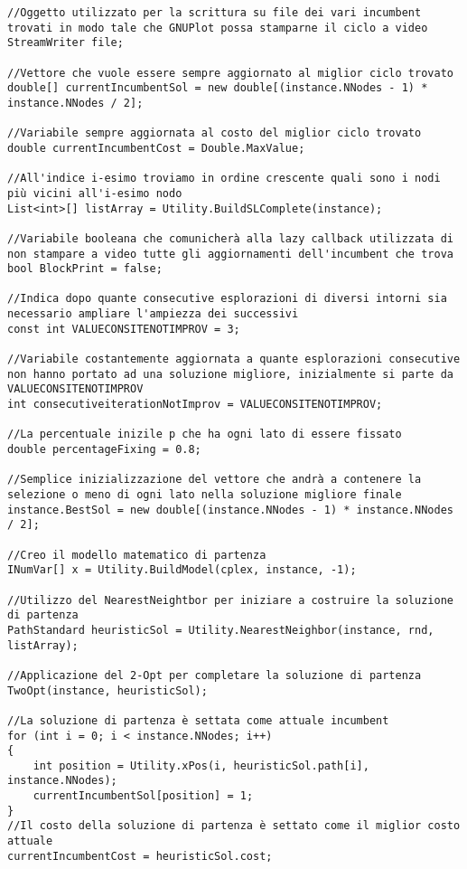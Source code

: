\documentclass[11pt]{article}
\begin{document}
\begin{lstlisting}
//Oggetto utilizzato per la scrittura su file dei vari incumbent trovati in modo tale che GNUPlot possa stamparne il ciclo a video
StreamWriter file;

//Vettore che vuole essere sempre aggiornato al miglior ciclo trovato
double[] currentIncumbentSol = new double[(instance.NNodes - 1) * instance.NNodes / 2];

//Variabile sempre aggiornata al costo del miglior ciclo trovato
double currentIncumbentCost = Double.MaxValue;

//All'indice i-esimo troviamo in ordine crescente quali sono i nodi più vicini all'i-esimo nodo
List<int>[] listArray = Utility.BuildSLComplete(instance);

//Variabile booleana che comunicherà alla lazy callback utilizzata di non stampare a video tutte gli aggiornamenti dell'incumbent che trova
bool BlockPrint = false;

//Indica dopo quante consecutive esplorazioni di diversi intorni sia necessario ampliare l'ampiezza dei successivi
const int VALUECONSITENOTIMPROV = 3;

//Variabile costantemente aggiornata a quante esplorazioni consecutive non hanno portato ad una soluzione migliore, inizialmente si parte da VALUECONSITENOTIMPROV
int consecutiveiterationNotImprov = VALUECONSITENOTIMPROV;

//La percentuale inizile p che ha ogni lato di essere fissato
double percentageFixing = 0.8;

//Semplice inizializzazione del vettore che andrà a contenere la selezione o meno di ogni lato nella soluzione migliore finale
instance.BestSol = new double[(instance.NNodes - 1) * instance.NNodes / 2];

//Creo il modello matematico di partenza
INumVar[] x = Utility.BuildModel(cplex, instance, -1);

//Utilizzo del NearestNeightbor per iniziare a costruire la soluzione di partenza
PathStandard heuristicSol = Utility.NearestNeighbor(instance, rnd, listArray);

//Applicazione del 2-Opt per completare la soluzione di partenza
TwoOpt(instance, heuristicSol);

//La soluzione di partenza è settata come attuale incumbent
for (int i = 0; i < instance.NNodes; i++)
{
    int position = Utility.xPos(i, heuristicSol.path[i], instance.NNodes);
    currentIncumbentSol[position] = 1;
}
//Il costo della soluzione di partenza è settato come il miglior costo attuale
currentIncumbentCost = heuristicSol.cost;


\end{lstlisting}
\end{document}
